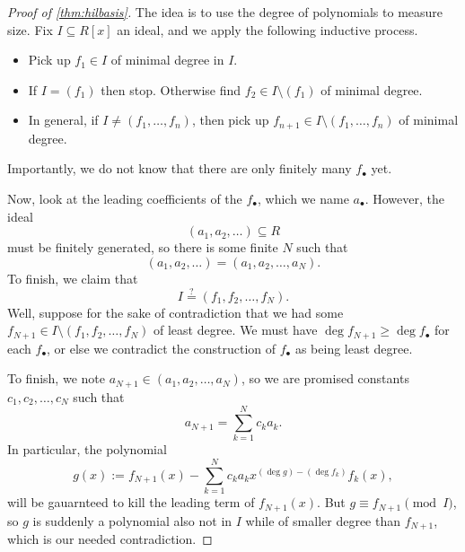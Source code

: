 \begin{proof}[Proof of \autoref{thm:hilbasis}]
	The idea is to use the degree of polynomials to measure size. Fix $I\subseteq R[x]$ an ideal, and we apply the following inductive process.
	\begin{itemize}
		\item Pick up $f_1\in I$ of minimal degree in $I$.
		\item If $I=(f_1)$ then stop. Otherwise find $f_2\in I\setminus(f_1)$ of minimal degree.
		\item In general, if $I\ne(f_1,\ldots,f_n)$, then pick up $f_{n+1}\in I\setminus(f_1,\ldots,f_n)$ of minimal degree.
	\end{itemize}
	Importantly, we do not know that there are only finitely many $f_\bullet$ yet.

	Now, look at the leading coefficients of the $f_\bullet$, which we name $a_\bullet$. However, the ideal
	\[(a_1,a_2,\ldots)\subseteq R\]
	must be finitely generated, so there is some finite $N$ such that
	\[(a_1,a_2,\ldots)=(a_1,a_2,\ldots,a_N).\]
	To finish, we claim that
	\[I\stackrel?=(f_1,f_2,\ldots,f_N).\]
	Well, suppose for the sake of contradiction that we had some $f_{N+1}\in I\setminus(f_1,f_2,\ldots,f_N)$ of least degree. We must have $\deg f_{N+1}\ge\deg f_\bullet$ for each $f_\bullet$, or else we contradict the construction of $f_\bullet$ as being least degree.

	To finish, we note $a_{N+1}\in(a_1,a_2,\ldots,a_N)$, so we are promised constants $c_1,c_2,\ldots,c_N$ such that
	\[a_{N+1}=\sum_{k=1}^Nc_ka_k.\]
	In particular, the polynomial
	\[g(x):=f_{N+1}(x)-\sum_{k=1}^Nc_ka_kx^{(\deg g)-(\deg f_k)}f_k(x),\]
	will be gauarnteed to kill the leading term of $f_{N+1}(x)$. But $g\equiv f_{N+1}\pmod I$, so $g$ is suddenly a polynomial also not in $I$ while of smaller degree than $f_{N+1}$, which is our needed contradiction.
\end{proof}

